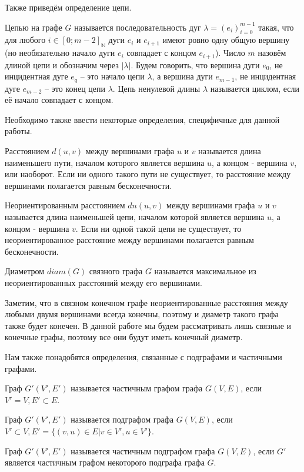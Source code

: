 Также приведём определение цепи.

\begin{defn}
	Цепью на графе $G$ называется последовательность дуг $\lambda = (e_i)_{i = 0}^{m-1}$ такая, что для любого $i \in [0;m-2]_\mathbb{N}$ дуги $e_i$ и $e_{i+1}$ имеют ровно одну общую вершину (но необязательно начало дуги $e_i$ совпадает с концом $e_{i+1}$). Число $m$ назовём длиной цепи и обозначим через $|\lambda|$. Будем говорить, что вершина дуги $e_0$, не инцидентная дуге $e_q$ -- это начало цепи $\lambda$, а вершина дуги $e_{m-1}$, не инцидентная дуге $e_{m-2}$ -- это конец цепи $\lambda$. Цепь ненулевой длины $\lambda$ называется циклом, если её начало совпадает с концом.
\end{defn} 

Необходимо также ввести некоторые определения, специфичные для данной работы.

\begin{defn}
	Расстоянием $d(u, v)$ между вершинами графа $u$ и $v$ называется длина наименьшего пути, началом которого является вершина $u$, а концом - вершина $v$, или наоборот. Если ни одного такого пути не существует, то расстояние между вершинами полагается равным бесконечности.
\end{defn}

\begin{defn}
	Неориентированным расстоянием $dn(u, v)$ между вершинами графа $u$ и $v$ называется длина наименьшей цепи, началом которой является вершина $u$, а концом - вершина $v$. Если ни одной такой цепи не существует, то неориентированное расстояние между вершинами полагается равным бесконечности.
\end{defn}

\begin{defn}
	Диаметром $diam(G)$ связного графа $G$ называется максимальное из неориентированных расстояний между его вершинами.
\end{defn}

Заметим, что в связном конечном графе неориентированные расстояния между любыми двумя вершинами всегда конечны, поэтому и диаметр такого графа также будет конечен. В данной работе мы будем рассматривать лишь связные и конечные графы, поэтому все они будут иметь конечный диаметр.

Нам также понадобятся определения, связанные с подграфами и частичными графами.

\begin{defn}
	 Граф $G'(V', E')$ называется частичным графом графа $G(V, E)$, если $V' = V, E' \subset E$.
\end{defn}

\begin{defn}
	Граф $G'(V', E')$ называется подграфом графа $G(V, E)$, если $V' \subset V, E' = \{(v, u) \in E | v \in V', u \in V'\}$.
\end{defn}

\begin{defn}
	Граф $G'(V', E')$ называется частичным подграфом графа $G(V, E)$, если $G'$ является частичным графом некоторого подграфа графа $G$.
\end{defn}